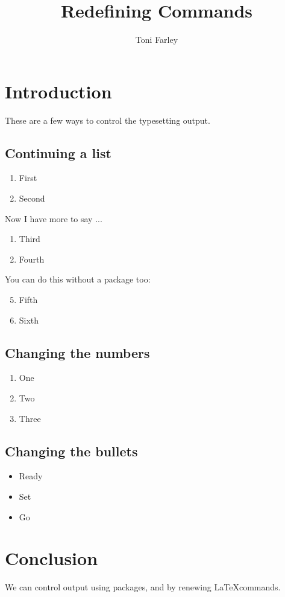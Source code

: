 \documentclass{article}
\title{Redefining Commands}
\author{Toni Farley}
\date{}
\begin{document}
\maketitle

\section{Introduction}

These are a few ways to control the typesetting output.

\subsection{Continuing a list}

\begin{enumerate}
\item First
\item Second
\end{enumerate}

Now I have more to say ...

\begin{enumerate}[resume]
\item Third
\item Fourth
\end{enumerate}

You can do this without a package too:

\begin{enumerate}
\setcounter{enumi}{4}
\item Fifth
\item Sixth
\end{enumerate}

\subsection{Changing the numbers}

\renewcommand{\theenumi}{\Alph{enumi}}
\begin{enumerate}
\item One
\item Two
\item Three
\end{enumerate}

\subsection{Changing the bullets}

\renewcommand{\labelitemi}{$\rightarrow$}
\begin{itemize}
\item Ready
\item Set
\item Go
\end{itemize}

\section{Conclusion}

We can control output using packages, and by renewing \LaTeX commands.
\end{document}
